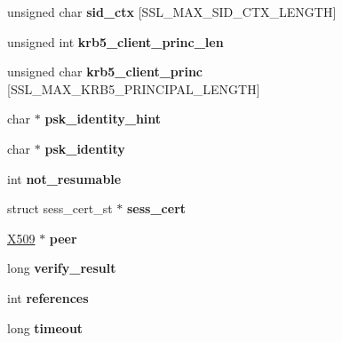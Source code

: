 \begin{DoxyCompactItemize}
unsigned char {\bfseries sid\+\_\+ctx} \mbox{[}S\+S\+L\+\_\+\+M\+A\+X\+\_\+\+S\+I\+D\+\_\+\+C\+T\+X\+\_\+\+L\+E\+N\+G\+TH\mbox{]}
\item 
\mbox{\label{structssl__session__st_ab87e9ec7a53c471d4f98d0479f48fc01}} 
unsigned int {\bfseries krb5\+\_\+client\+\_\+princ\+\_\+len}
\item 
\mbox{\label{structssl__session__st_a0b4981b6ae2db5a19c054026c354c062}} 
unsigned char {\bfseries krb5\+\_\+client\+\_\+princ} \mbox{[}S\+S\+L\+\_\+\+M\+A\+X\+\_\+\+K\+R\+B5\+\_\+\+P\+R\+I\+N\+C\+I\+P\+A\+L\+\_\+\+L\+E\+N\+G\+TH\mbox{]}
\item 
\mbox{\label{structssl__session__st_a41b456bc4b62a3c246372c264b380f92}} 
char $\ast$ {\bfseries psk\+\_\+identity\+\_\+hint}
\item 
\mbox{\label{structssl__session__st_a3dce1596980f30431f28a87db7a4161e}} 
char $\ast$ {\bfseries psk\+\_\+identity}
\item 
\mbox{\label{structssl__session__st_a1b4d198b4cf95c73b1e73b06cf521bac}} 
int {\bfseries not\+\_\+resumable}
\item 
\mbox{\label{structssl__session__st_abd0e4711818e1c3373870f0e09d718be}} 
struct sess\+\_\+cert\+\_\+st $\ast$ {\bfseries sess\+\_\+cert}
\item 
\mbox{\label{structssl__session__st_a925bea83587ffedbbdb4aa386b75a2d7}} 
\hyperlink{structx509__st}{X509} $\ast$ {\bfseries peer}
\item 
\mbox{\label{structssl__session__st_a448769f219815a3a49b726d5ab288783}} 
long {\bfseries verify\+\_\+result}
\item 
\mbox{\label{structssl__session__st_a1b4fccb7a3ccf9f1521896f8bc900801}} 
int {\bfseries references}
\item 
\mbox{\label{structssl__session__st_a69db42a9260a726806b5f6f92923c90b}} 
long {\bfseries timeout}
\item 

\end{DoxyCompactItemize}
